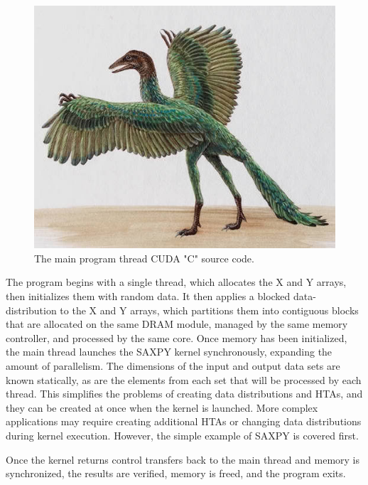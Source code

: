 \documentclass[conference, 10pt]{IEEEtran}
\begin{document}
\begin{figure}
	\begin{center}
		\includegraphics[width=0.9\linewidth]{archaeopteryx-bird}
		\caption{The main program thread CUDA "C" source code.}
		\label{fig:saxpy-main-thread}
	\end{center}
\end{figure}

The program begins with a single thread, which allocates the X and Y arrays,
then initializes them with random data.  It then applies a blocked
data-distribution to the X and Y arrays, which partitions them into contiguous
blocks that are allocated on the same DRAM module, managed by the same memory
controller, and processed by the same core.  Once memory has been initialized,
the main thread launches the SAXPY kernel synchronously, expanding the amount
of parallelism.  The dimensions of the input and output data sets are known
statically, as are the elements from each set that will be processed by each
thread.  This simplifies the problems of creating data distributions and HTAs,
and they can be created at once when the kernel is launched.  More complex
applications may require creating additional HTAs or changing data distributions
during kernel execution.  However, the simple example of SAXPY is covered first.  

Once the kernel returns control transfers back to the main thread and
memory is synchronized, the results are verified, memory is freed, and the
program exits.  
\end{document}
